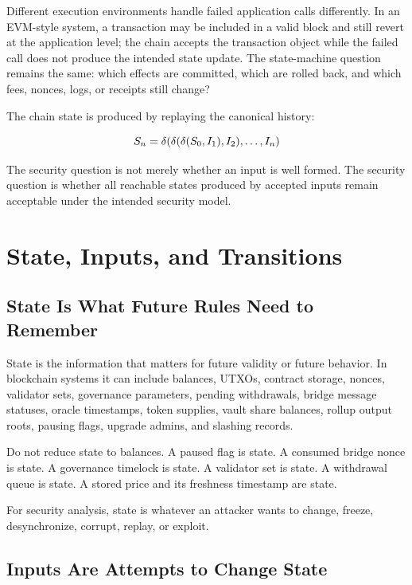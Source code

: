 Different execution environments handle failed application calls differently. In an EVM-style system, a transaction may be included in a valid block and still revert at the application level; the chain accepts the transaction object while the failed call does not produce the intended state update. The state-machine question remains the same: which effects are committed, which are rolled back, and which fees, nonces, logs, or receipts still change?

The chain state is produced by replaying the canonical history:

\[
S_n =
\delta(
  \delta(
    \delta(S_0, I_1),
    I_2),
  \ldots,
  I_n)
\]

The security question is not merely whether an input is well formed. The security question is whether all reachable states produced by accepted inputs remain acceptable under the intended security model.

\section{State, Inputs, and Transitions}

\subsection{State Is What Future Rules Need to Remember}

State is the information that matters for future validity or future behavior. In blockchain systems it can include balances, UTXOs, contract storage, nonces, validator sets, governance parameters, pending withdrawals, bridge message statuses, oracle timestamps, token supplies, vault share balances, rollup output roots, pausing flags, upgrade admins, and slashing records.

Do not reduce state to balances. A paused flag is state. A consumed bridge nonce is state. A governance timelock is state. A validator set is state. A withdrawal queue is state. A stored price and its freshness timestamp are state.

For security analysis, state is whatever an attacker wants to change, freeze, desynchronize, corrupt, replay, or exploit.

\subsection{Inputs Are Attempts to Change State}

